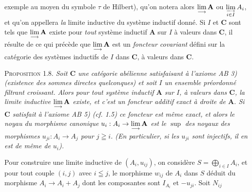 exemple au moyen du symbole $\tau$ de Hilbert), qu'on notera alors
$\mathop{\rm lim}\limits_{\longrightarrow}\mathbf A$ ou
$\mathop{\rm lim}\limits_{\substack{\longrightarrow\\i\in I}}A_i$, et qu'on
appellera \textit{la} limite inductive du système inductif donné.
Si $I$ et $\mathbf{C}$ sont tels que
$\mathop{\rm lim}\limits_{\longrightarrow}\mathbf A$ existe pour
\textit{tout} système inductif $\mathbf A$ sur $I$ à valeurs dans $\mathbf{C}$, il
résulte de ce qui précède que
$\mathop{\rm lim}\limits_{\longrightarrow}\mathbf A$ est un \textit{foncteur
covariant} défini sur la catégorie des systèmes inductifs de $I$ dans $\mathbf{C}$, à
valeurs dans $\mathbf{C}$.

\textsc{Proposition 1.8.} \textit{Soit $\mathbf{C}$ une catégorie
abélienne satisfaisant à l'axiome \textup{AB 3)} (existence des sommes directes
quelconques) et soit $I$ un ensemble préordonné filtrant croissant. Alors pour
tout système inductif $\mathbf A$ sur $I$, à valeurs dans $\mathbf{C}$, la limite
inductive $\mathop{\rm lim}\limits_{\longrightarrow}\mathbf A$ existe, et
c'est un foncteur additif exact à droite de $\mathbf A$. Si $\mathbf{C}$ satisfait à
l'axiome \textup{AB 5)} \textup{(\textit{cf.} 1.5)} ce foncteur est même exact, et alors le noyau du
morphisme canonique
$u_i:A_i\to\mathop{\rm lim}\limits_{\longrightarrow}\mathbf A$
est le $\sup$ des noyaux des morphismes $u_{ji}:A_i\to A_j$ pour
$j\geqq i$. (En particulier, si les $u_{ji}$ sont injectifs, il en est de même
de $u_i$).}

Pour construire une limite inductive de $(A_i,u_{ij})$, on considère $S=\displaystyle\bigoplus_{i\in I}A_i$, et pour tout couple $(i,j)$ avec $i\leqq j$, le morphisme $w_{ij}$ de
$A_i$ dans $S$ déduit du morphisme $A_i\to A_i+A_j$ dont les
composantes sont $I_{A_i}$ et $-u_{ji}$. Soit $N_{ij}$

